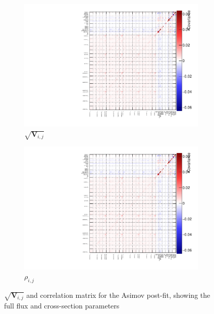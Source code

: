 \begin{figure}[h]
	\begin{subfigure}[t]{0.49\textwidth}
		\includegraphics[width=\textwidth, trim={0mm 0mm 0mm 0mm}, clip,page=2]{figures/mach3/Asimov/2017b_NewDet_NewData_Asimov_Long_0_drawCorr.pdf}
		\caption{$\sqrt{\mathbf{V}_{i,j}}$}
	\end{subfigure}
	\begin{subfigure}[t]{0.49\textwidth}
		\includegraphics[width=\textwidth, trim={0mm 0mm 0mm 0mm}, clip,page=3]{figures/mach3/Asimov/2017b_NewDet_NewData_Asimov_Long_0_drawCorr.pdf}
		\caption{$\rho_{i,j}$}
	\end{subfigure}
	\caption{$\sqrt{\mathbf{V}_{i,j}}$ and correlation matrix for the Asimov post-fit, showing the full flux and cross-section parameters}
	\label{fig:asimov_full_corr}
\end{figure}

